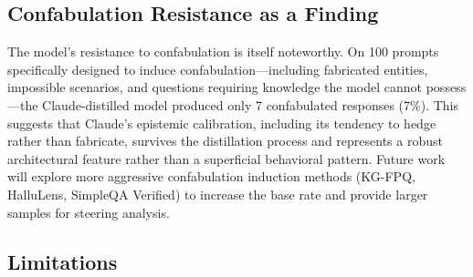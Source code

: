 \subsection{Confabulation Resistance as a Finding}

The model's resistance to confabulation is itself noteworthy. On 100
prompts specifically designed to induce confabulation---including
fabricated entities, impossible scenarios, and questions requiring
knowledge the model cannot possess---the Claude-distilled model produced
only 7 confabulated responses (7\%). This suggests that Claude's
epistemic calibration, including its tendency to hedge rather than
fabricate, survives the distillation process and represents a robust
architectural feature rather than a superficial behavioral pattern.
Future work will explore more aggressive confabulation induction methods
(KG-FPQ, HalluLens, SimpleQA Verified) to increase the base rate and
provide larger samples for steering analysis.

\subsection{Limitations}

